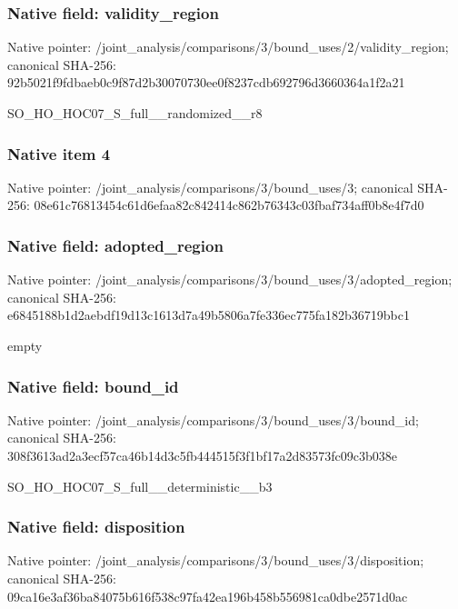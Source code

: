 \documentclass[10pt,a4paper]{article}
\begin{document}
\subsubsection{Native field: validity\_\allowbreak{}region}
Native pointer: /joint\_\allowbreak{}analysis/comparisons/3/bound\_\allowbreak{}uses/2/validity\_\allowbreak{}region; canonical SHA-256: 92b5021f9fdbaeb0c9f87d2b30070730ee0f8237cdb692796d3660364a1f2a21

\begingroup\raggedright\sloppy SO\_\allowbreak{}HO\_\allowbreak{}HOC07\_\allowbreak{}S\_\allowbreak{}full\_\allowbreak{}\_\allowbreak{}randomized\_\allowbreak{}\_\allowbreak{}r8\par\endgroup

\subsubsection{Native item 4}
Native pointer: /joint\_\allowbreak{}analysis/comparisons/3/bound\_\allowbreak{}uses/3; canonical SHA-256: 08e61c76813454c61d6efaa82c842414c862b76343c03fbaf734aff0b8e4f7d0

\subsubsection{Native field: adopted\_\allowbreak{}region}
Native pointer: /joint\_\allowbreak{}analysis/comparisons/3/bound\_\allowbreak{}uses/3/adopted\_\allowbreak{}region; canonical SHA-256: e6845188b1d2aebdf19d13c1613d7a49b5806a7fe336ec775fa182b36719bbc1

\begingroup\raggedright\sloppy empty\par\endgroup

\subsubsection{Native field: bound\_\allowbreak{}id}
Native pointer: /joint\_\allowbreak{}analysis/comparisons/3/bound\_\allowbreak{}uses/3/bound\_\allowbreak{}id; canonical SHA-256: 308f3613ad2a3ecf57ca46b14d3c5fb444515f3f1bf17a2d83573fc09c3b038e

\begingroup\raggedright\sloppy SO\_\allowbreak{}HO\_\allowbreak{}HOC07\_\allowbreak{}S\_\allowbreak{}full\_\allowbreak{}\_\allowbreak{}deterministic\_\allowbreak{}\_\allowbreak{}b3\par\endgroup

\subsubsection{Native field: disposition}
Native pointer: /joint\_\allowbreak{}analysis/comparisons/3/bound\_\allowbreak{}uses/3/disposition; canonical SHA-256: 09ca16e3af36ba84075b616f538c97fa42ea196b458b556981ca0dbe2571d0ac
\end{document}
